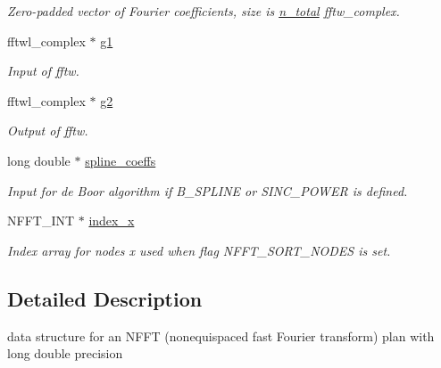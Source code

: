 \begin{DoxyCompactItemize}
\begin{DoxyCompactList}\small\item\em Zero-\/padded vector of Fourier coefficients, size is \hyperlink{structnfftl__plan_afbc61ba78ca220fc8d6c72624772f991}{n\-\_\-total} fftw\-\_\-complex. \end{DoxyCompactList}\item 
\hypertarget{structnfftl__plan_a71a99cd893a823d1a7edb139650b2afe}{fftwl\-\_\-complex $\ast$ \hyperlink{structnfftl__plan_a71a99cd893a823d1a7edb139650b2afe}{g1}}\label{structnfftl__plan_a71a99cd893a823d1a7edb139650b2afe}

\begin{DoxyCompactList}\small\item\em Input of fftw. \end{DoxyCompactList}\item 
\hypertarget{structnfftl__plan_aea25feca0bccefe267c0a9eb75390ed6}{fftwl\-\_\-complex $\ast$ \hyperlink{structnfftl__plan_aea25feca0bccefe267c0a9eb75390ed6}{g2}}\label{structnfftl__plan_aea25feca0bccefe267c0a9eb75390ed6}

\begin{DoxyCompactList}\small\item\em Output of fftw. \end{DoxyCompactList}\item 
\hypertarget{structnfftl__plan_a971f190366e40c729899ff71d2a60682}{long double $\ast$ \hyperlink{structnfftl__plan_a971f190366e40c729899ff71d2a60682}{spline\-\_\-coeffs}}\label{structnfftl__plan_a971f190366e40c729899ff71d2a60682}

\begin{DoxyCompactList}\small\item\em Input for de Boor algorithm if B\-\_\-\-S\-P\-L\-I\-N\-E or S\-I\-N\-C\-\_\-\-P\-O\-W\-E\-R is defined. \end{DoxyCompactList}\item 
N\-F\-F\-T\-\_\-\-I\-N\-T $\ast$ \hyperlink{structnfftl__plan_a29a7a33a921435989294d8ea83111b90}{index\-\_\-x}
\begin{DoxyCompactList}\small\item\em Index array for nodes x used when flag N\-F\-F\-T\-\_\-\-S\-O\-R\-T\-\_\-\-N\-O\-D\-E\-S is set. \end{DoxyCompactList}\end{DoxyCompactItemize}


\subsection{Detailed Description}
data structure for an N\-F\-F\-T (nonequispaced fast Fourier transform) plan with long double precision 

